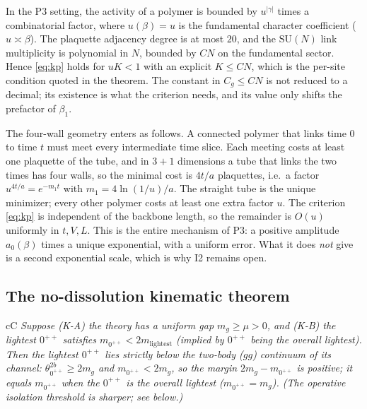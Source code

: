 In the P3 setting, the activity of a polymer is bounded by $u^{|\gamma|}$ times a combinatorial
factor, where $u(\beta)=u$ is the fundamental character coefficient ($u\asymp\beta$). The
plaquette adjacency degree is at most $20$, and the $\mathrm{SU}(N)$ link multiplicity is
polynomial in $N$, bounded by $CN$ on the fundamental sector. Hence \eqref{eq:kp} holds for
$uK<1$ with an explicit $K\le CN$, which is the per-site condition quoted in the theorem. The
constant in $C_g\le CN$ is not reduced to a decimal; its existence is what the criterion needs,
and its value only shifts the prefactor of $\beta_1$.

The four-wall geometry enters as follows. A connected polymer that links time $0$ to time $t$
must meet every intermediate time slice. Each meeting costs at least one plaquette of the tube,
and in $3+1$ dimensions a tube that links the two times has four walls, so the minimal cost is
$4t/a$ plaquettes, i.e.\ a factor $u^{4t/a}=e^{-m_1t}$ with $m_1=4\ln(1/u)/a$. The straight
tube is the unique minimizer; every other polymer costs at least one extra factor $u$. The
criterion \eqref{eq:kp} is independent of the backbone length, so the remainder is $O(u)$
uniformly in $t,V,L$. This is the entire mechanism of P3: a positive amplitude $a_0(\beta)$
times a unique exponential, with a uniform error. What it does \emph{not} give is a second
exponential scale, which is why I2 remains open.

\subsection{The no-dissolution kinematic theorem}
\label{sec:nodiss}


\begin{claimbox}{cC}
 \emph{Suppose (K-A) the theory has a uniform gap
$m_g\ge\mu>0$, and (K-B) the lightest $0^{++}$ satisfies $m_{0^{++}}<2m_{\mathrm{lightest}}$
(implied by $0^{++}$ being the overall lightest). Then the lightest $0^{++}$ lies strictly below
the two-body ($gg$) continuum of its channel: $\theta^{2b}_{0^{++}}\ge2m_g$ and
$m_{0^{++}}<2m_g$, so the margin $2m_g-m_{0^{++}}$ is positive; it equals $m_{0^{++}}$ when the
$0^{++}$ is the overall lightest ($m_{0^{++}}=m_g$). (The operative isolation threshold is
sharper; see below.)}
\end{claimbox}

